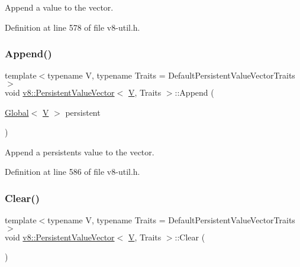 Append a value to the vector. 

Definition at line 578 of file v8-\/util.\+h.

\mbox{\label{classv8_1_1PersistentValueVector_ad076923fd0046196670e87e996582546}} 
\subsubsection{\texorpdfstring{Append()}{Append()}\hspace{0.1cm}{\footnotesize\ttfamily [2/2]}}
{\footnotesize\ttfamily template$<$typename V, typename Traits = Default\+Persistent\+Value\+Vector\+Traits$>$ \\
void \mbox{\hyperlink{classv8_1_1PersistentValueVector}{v8\+::\+Persistent\+Value\+Vector}}$<$ \mbox{\hyperlink{classV}{V}}, Traits $>$\+::Append (\begin{DoxyParamCaption}\item[{\mbox{\hyperlink{classv8_1_1Global}{Global}}$<$ \mbox{\hyperlink{classV}{V}} $>$}]{persistent }\end{DoxyParamCaption})\hspace{0.3cm}{\ttfamily [inline]}}

Append a persistent\textquotesingle{}s value to the vector. 

Definition at line 586 of file v8-\/util.\+h.

\mbox{\label{classv8_1_1PersistentValueVector_ad07f449c2004b4f3d91e58cabde99a53}} 
\subsubsection{\texorpdfstring{Clear()}{Clear()}}
{\footnotesize\ttfamily template$<$typename V, typename Traits = Default\+Persistent\+Value\+Vector\+Traits$>$ \\
void \mbox{\hyperlink{classv8_1_1PersistentValueVector}{v8\+::\+Persistent\+Value\+Vector}}$<$ \mbox{\hyperlink{classV}{V}}, Traits $>$\+::Clear (\begin{DoxyParamCaption}{ }\end{DoxyParamCaption})\hspace{0.3cm}{\ttfamily [inline]}}

